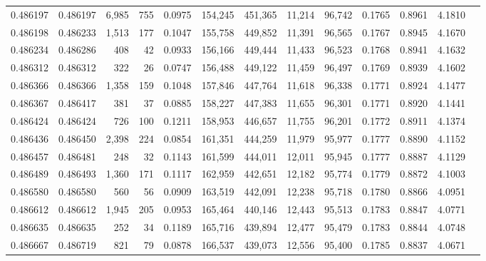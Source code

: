 \begin{tabular}{rrrrrrrrrrrrr}
0.486197 & 0.486197 & 6,985 &   755 &                                     0.0975 & 154,245 & 451,365 &  11,214 &  96,742 & 0.1765 & 0.8961 & 4.1810 \\
0.486198 & 0.486233 & 1,513 &   177 &                                     0.1047 & 155,758 & 449,852 &  11,391 &  96,565 & 0.1767 & 0.8945 & 4.1670 \\
0.486234 & 0.486286 &   408 &    42 &                                     0.0933 & 156,166 & 449,444 &  11,433 &  96,523 & 0.1768 & 0.8941 & 4.1632 \\
0.486312 & 0.486312 &   322 &    26 &                                     0.0747 & 156,488 & 449,122 &  11,459 &  96,497 & 0.1769 & 0.8939 & 4.1602 \\
0.486366 & 0.486366 & 1,358 &   159 &                                     0.1048 & 157,846 & 447,764 &  11,618 &  96,338 & 0.1771 & 0.8924 & 4.1477 \\
0.486367 & 0.486417 &   381 &    37 &                                     0.0885 & 158,227 & 447,383 &  11,655 &  96,301 & 0.1771 & 0.8920 & 4.1441 \\
0.486424 & 0.486424 &   726 &   100 &                                     0.1211 & 158,953 & 446,657 &  11,755 &  96,201 & 0.1772 & 0.8911 & 4.1374 \\
0.486436 & 0.486450 & 2,398 &   224 &                                     0.0854 & 161,351 & 444,259 &  11,979 &  95,977 & 0.1777 & 0.8890 & 4.1152 \\
0.486457 & 0.486481 &   248 &    32 &                                     0.1143 & 161,599 & 444,011 &  12,011 &  95,945 & 0.1777 & 0.8887 & 4.1129 \\
0.486489 & 0.486493 & 1,360 &   171 &                                     0.1117 & 162,959 & 442,651 &  12,182 &  95,774 & 0.1779 & 0.8872 & 4.1003 \\
0.486580 & 0.486580 &   560 &    56 &                                     0.0909 & 163,519 & 442,091 &  12,238 &  95,718 & 0.1780 & 0.8866 & 4.0951 \\
0.486612 & 0.486612 & 1,945 &   205 &                                     0.0953 & 165,464 & 440,146 &  12,443 &  95,513 & 0.1783 & 0.8847 & 4.0771 \\
0.486635 & 0.486635 &   252 &    34 &                                     0.1189 & 165,716 & 439,894 &  12,477 &  95,479 & 0.1783 & 0.8844 & 4.0748 \\
0.486667 & 0.486719 &   821 &    79 &                                     0.0878 & 166,537 & 439,073 &  12,556 &  95,400 & 0.1785 & 0.8837 & 4.0671 \\

\end{tabular}
